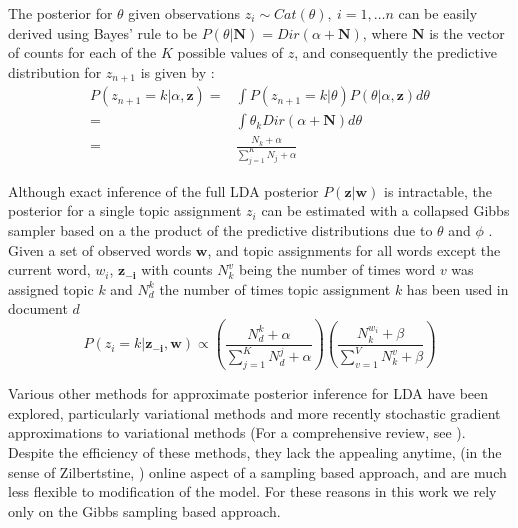 The posterior for $\theta$ given observations $z_i \sim Cat(\theta),~i = 1, \ldots n$ can be easily derived using Bayes' rule to be $P(\theta | \boldsymbol{N}) = Dir(\alpha + \boldsymbol{N})$, where $\boldsymbol{N}$ is the vector of counts for each of the $K$ possible values of $z$, and consequently the predictive distribution for $z_{n+1}$ is given by \citep{BishopCh2}:
\begin{equation}
\begin{split}
P(z_{n+1}=k | \alpha, \boldsymbol{z}) =& \int P(z_{n+1}=k | \theta) P(\theta | \alpha, \boldsymbol{z}) d\theta\\
=& \int \theta_k Dir(\alpha + \boldsymbol{N}) d\theta\\
=& \frac{N_k + \alpha}{\sum_{j=1}^K N_j + \alpha}
\end{split}
\end{equation}

Although exact inference of the full LDA posterior $P(\boldsymbol{z} | \boldsymbol{w})$ is intractable, the posterior for a single topic assignment $z_i$ can be estimated with a collapsed Gibbs sampler based on a the product of the predictive distributions due to $\theta$ and $\phi$ \citep{griffiths2004}. Given a set of observed words $\textbf{w}$, and topic assignments for all words except the current word, $w_i$, $\boldsymbol{z_{-i}}$ with counts $N^v_k$ being the number of times word $v$ was assigned topic $k$ and $N^k_d$ the number of times topic assignment $k$ has been used in document $d$
\begin{equation} \label{eqn:posterior}
P(z_i = k | \boldsymbol{z_{-i}}, \boldsymbol{w}) \propto \left(\frac{N^k_d + \alpha}{\sum_{j=1}^K N^j_d + \alpha}\right)
   \left( \frac{N^{w_i}_k + \beta}{\sum_{v=1}^V N^v_k + \beta} \right)
\end{equation}

Various other methods for approximate posterior inference for LDA have been explored, particularly variational methods and more recently stochastic gradient approximations to variational methods (For a comprehensive review, see \citep{geigle2016}). Despite the efficiency of these methods, they lack the appealing anytime,
(in the sense of Zilbertstine, \citep{zilberstein1996anytime})
online aspect of a sampling based approach, and are much less flexible to modification of the model. For these reasons in this work we rely only on the Gibbs sampling based approach.

